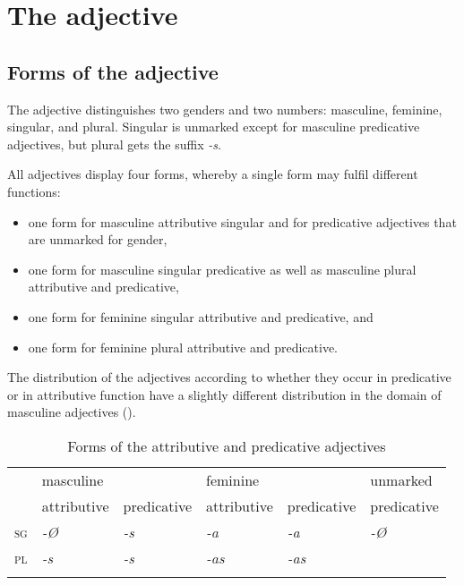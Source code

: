 \section{The adjective}
\subsection{Forms of the adjective}
The adjective distinguishes two genders and two numbers: masculine, feminine, singular, and plural. Singular is unmarked except for masculine predicative adjectives, but plural gets the suffix \textit{-s}.

All adjectives display four forms, whereby a single form may fulfil different functions:

\begin{itemize}
\item one form for masculine attributive singular and for predicative adjectives that are unmarked for gender,
\item one form for masculine singular predicative as well as masculine plural attributive and predicative,
\item one form for feminine singular attributive and predicative, and
\item one form for feminine plural attributive and predicative.
\end{itemize}

The distribution of the adjectives according to whether they occur in predicative or in attributive function have a slightly different distribution in the domain of masculine adjectives ().

\begin{table}
	\caption{Forms of the attributive and predicative adjectives}
	\label{tab:adj:attrandpred}
	\begin{tabular}{llllll}
		\lsptoprule
		& masculine && feminine && unmarked \\
		&		attributive & predicative& attributive & predicative & predicative \\
		\midrule
		\textsc{sg} & \textit{-Ø} & \textit{-s} & \textit{-a} & \textit{-a} & \textit{-Ø}\\
		\textsc{pl} & \textit{-s} & \textit{-s} & \textit{-as} & \textit{-as}\\
		\lspbottomrule
	\end{tabular}
\end{table}

